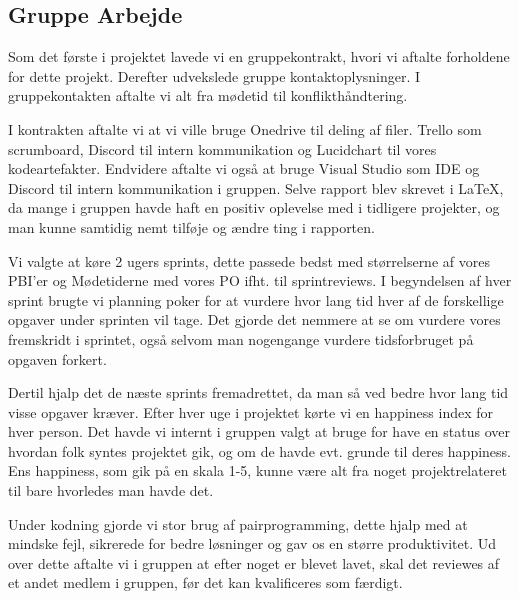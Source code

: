 \subsection{Gruppe Arbejde}
Som det første i projektet lavede vi en gruppekontrakt, 
hvori vi aftalte forholdene for dette projekt. Derefter udvekslede gruppe kontaktoplysninger.
I gruppekontakten aftalte vi alt fra mødetid til konflikthåndtering.

I kontrakten aftalte vi at vi ville bruge Onedrive til deling af filer. Trello som scrumboard,
Discord til intern kommunikation og Lucidchart til vores kodeartefakter. Endvidere aftalte vi også
at bruge Visual Studio som IDE og Discord til intern kommunikation i gruppen.
Selve rapport blev skrevet i \LaTeX, da mange i gruppen havde haft en positiv oplevelse med
i tidligere projekter, og man kunne samtidig nemt tilføje og ændre ting i rapporten.

Vi valgte at køre 2 ugers sprints, dette passede bedst med størrelserne af vores
PBI'er og Mødetiderne med vores PO ifht. til sprintreviews.
I begyndelsen af hver sprint brugte vi planning poker for at vurdere hvor lang tid
hver af de forskellige opgaver under sprinten vil tage. Det gjorde det nemmere at se 
om vurdere vores fremskridt i sprintet, også selvom man nogengange vurdere tidsforbruget på opgaven forkert.


Dertil hjalp det de næste sprints fremadrettet, da man så ved bedre hvor lang tid visse opgaver kræver.
Efter hver uge i projektet kørte vi en happiness index for hver person. Det havde vi internt i gruppen valgt
at bruge for have en status over hvordan folk syntes projektet gik, og om de havde evt. grunde til deres happiness.
Ens happiness, som gik på en skala 1-5, kunne være alt fra noget projektrelateret til bare hvorledes man havde det.

Under kodning gjorde vi stor brug af pairprogramming, dette hjalp med at mindske fejl, sikrerede for bedre løsninger
og gav os en større produktivitet. Ud over dette aftalte vi i gruppen at efter noget er blevet lavet, 
skal det reviewes af et andet medlem i gruppen, før det kan kvalificeres som færdigt.

